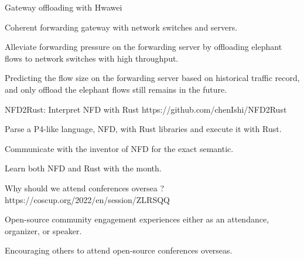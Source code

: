 \begin{cventries}
      \cventry
        {} %
        {Gateway offloading with Hwawei} %
        {} %
        {} %
        {
          \vspace{-2mm}
          \begin{cvitems} %
            \item {Coherent forwarding gateway with network switches and servers.}
            \item {Alleviate forwarding pressure on the forwarding server by offloading elephant flows to network switches with high throughput.}
            \item {Predicting the flow size on the forwarding server based on historical traffic record, and only offload the elephant flows still remains in the future.}
          \end{cvitems}
        }

        \vspace{-3mm}
  
        \cventry
          {} %
          {NFD2Rust: Interpret NFD with Rust} %
          {} %
          {https://github.com\linebreak/chenIshi/NFD2Rust} %
          {
            \vspace{-2mm}
            \begin{cvitems} %
              \item {Parse a P4-like language, NFD, with Rust libraries and execute it with Rust.}
              \item {Communicate with the inventor of NFD for the exact semantic.}
              \item {Learn both NFD and Rust with the month.}
            \end{cvitems}
          }

          \vspace{-3mm}
  
          \cventry
            {} %
            {Why should we attend conferences oversea ?} %
            {} %
            {https://coscup.org/2022\linebreak/en/session/ZLRSQQ} %
            {
              \vspace{-2mm}
              \begin{cvitems} %
                \item {Open-source community engagement experiences either as an attendance, organizer, or speaker.}
                \item {Encouraging others to attend open-source conferences overseas.}
              \end{cvitems}
            }


\end{cventries}
